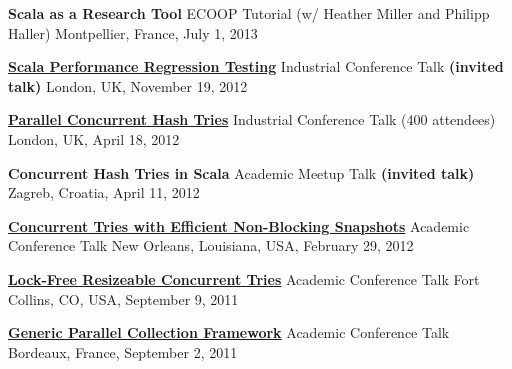 \documentclass[9pt]{article}
\begin{document}
\noindent
{\bf Scala as a Research Tool}
\vspace{-0.03in}
\newline\noindent ECOOP Tutorial
                  (w/ Heather Miller and Philipp Haller)
\dates{}
\linebreak\noindent Montpellier, France, July 1, 2013
\bigskip

\noindent
\href{https://skillsmatter.com/skillscasts/3701-scala-performance-regression-testing}
{\bf Scala Performance Regression Testing}
\vspace{-0.03in}
\newline\noindent Industrial Conference Talk \textbf{(invited talk)}
\dates{}
\linebreak\noindent London, UK, November 19, 2012
\bigskip

\noindent\href{https://skillsmatter.com/skillscasts/3234-parallel-concurrent-hash-tries}
{\bf Parallel Concurrent Hash Tries}
\vspace{-0.03in}
\newline\noindent Industrial Conference Talk (400 attendees)
\dates{}
\linebreak\noindent London, UK, April 18, 2012
\bigskip

\noindent
{\bf Concurrent Hash Tries in Scala}
\vspace{-0.03in}
\newline\noindent Academic Meetup Talk \textbf{(invited talk)}
\dates{}
\linebreak\noindent Zagreb, Croatia, April 11, 2012
\bigskip

\noindent\href{http://axel22.github.io/resources/docs/ctries-snapshots.pptx}
{\bf Concurrent Tries with Efficient Non-Blocking Snapshots}
\vspace{-0.03in}
\newline\noindent Academic Conference Talk
\dates{}
\linebreak\noindent New Orleans, Louisiana, USA, February 29, 2012
\bigskip

\noindent
\href{http://lcpc11.cs.colostate.edu/}
{\bf Lock-Free Resizeable Concurrent Tries}
\vspace{-0.03in}
\newline\noindent Academic Conference Talk
\dates{}
\linebreak\noindent Fort Collins, CO, USA, September 9, 2011
\bigskip

\noindent
\href{http://europar2011.bordeaux.inria.fr/conference.php}
{\bf Generic Parallel Collection Framework}
\vspace{-0.03in}
\newline\noindent Academic Conference Talk
\dates{}
\linebreak\noindent Bordeaux, France, September 2, 2011
\bigskip
\end{document}
